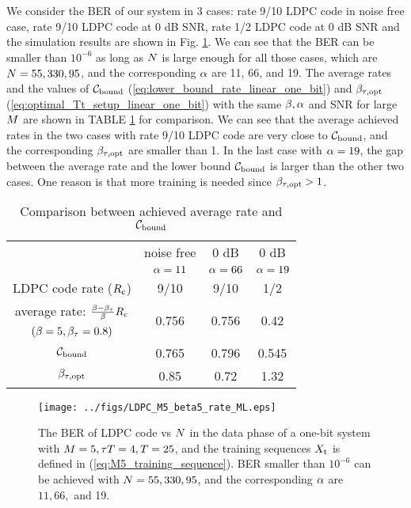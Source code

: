 \documentclass[conference]{IEEEtran}
\begin{document}
We consider the BER of our system in 3 cases: rate 9/10 LDPC code in noise free case, rate 9/10 LDPC code  at 0 dB SNR, rate 1/2 LDPC code at 0 dB SNR and the simulation results are shown in Fig. \ref{fig:LDPC_M5_beta5_rate}. We can see that the BER can be smaller than $10^{-6}$ as long as $N$ is large enough for all those cases, which are $N=55,330,95$, and the corresponding $\alpha$ are 11, 66, and 19. The average rates and the values of $\mathcal{C}_{\rm bound}$ (\ref{eq:lower_bound_rate_linear_one_bit}) and $\beta_{\rm {\tau,opt}}$ (\ref{eq:optimal_Tt_setup_linear_one_bit}) with the same $\beta,\alpha$ and SNR for large $M$ are shown in TABLE \ref{tab:compariosn_rate_bound} for comparison. We can see that the average achieved rates in the two cases with rate 9/10 LDPC code are very close to $\mathcal{C}_{\rm bound}$, and the corresponding $\beta_{\rm {\tau,opt}}$ are smaller than 1. In the last case with $\alpha=19$, the gap between the average rate and the lower bound $\mathcal{C}_{\rm bound}$ is larger than the other two cases. One reason is that more training is needed since $\beta_{\rm {\tau,opt}}>1$.


\begin{table}[ht]
\caption{Comparison between achieved average rate  and $\mathcal{C}_{\rm bound}$}
\label{tab:compariosn_rate_bound}
\begin{tabular}{ |c|c|c|c| }
\hline
&noise free & 0 dB & 0 dB \\ 
&$\alpha=11$ & $\alpha = 66$ & $\alpha = 19$ \\
\hline
LDPC code rate ($R_{\rm c}$) & 9/10 & 9/10 & 1/2\\
\hline
average rate: $\frac{\beta-\beta_{\rm{\tau}}}{\beta}R_{\rm c}$ & \multirow{2}{*}{0.756}  & \multirow{2}{*}{0.756} & \multirow{2}{*}{0.42}
\\ 
$(\beta=5,\beta_{\rm{\tau}}=0.8)$ & & & \\ \hline
$\mathcal{C}_{\rm bound}$& 0.765 & 0.796& 0.545\\ \hline
$\beta_{\rm {\tau,opt}}$& 0.85 &0.72 & 1.32 \\ \hline
\end{tabular}
\end{table}

\begin{figure}
\texttt{[image: ../figs/LDPC\_M5\_beta5\_rate\_ML.eps]}
\centering
    \caption{The BER of LDPC code vs $N$ in the data phase of a one-bit system with $M=5,{\tau T}=4,T=25$, and the training sequences $X_{\rm t}$ is defined in (\ref{eq:M5_training_sequence}). BER smaller than $10^{-6}$ can be achieved with $N=55,330,95$, and the corresponding $\alpha$ are $11,66,$ and 19.}
    \label{fig:LDPC_M5_beta5_rate}
\end{figure}
\end{document}
